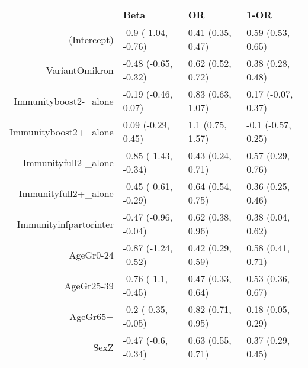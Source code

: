 \begin{table}[ht]
\centering
\begin{tabular}{rlll}
  \hline
 & Beta & OR & 1-OR \\ 
  \hline
(Intercept) & -0.9 (-1.04, -0.76) & 0.41 (0.35, 0.47) & 0.59 (0.53, 0.65) \\ 
  VariantOmikron & -0.48 (-0.65, -0.32) & 0.62 (0.52, 0.72) & 0.38 (0.28, 0.48) \\ 
  Immunityboost2-\_alone & -0.19 (-0.46, 0.07) & 0.83 (0.63, 1.07) & 0.17 (-0.07, 0.37) \\ 
  Immunityboost2+\_alone & 0.09 (-0.29, 0.45) & 1.1 (0.75, 1.57) & -0.1 (-0.57, 0.25) \\ 
  Immunityfull2-\_alone & -0.85 (-1.43, -0.34) & 0.43 (0.24, 0.71) & 0.57 (0.29, 0.76) \\ 
  Immunityfull2+\_alone & -0.45 (-0.61, -0.29) & 0.64 (0.54, 0.75) & 0.36 (0.25, 0.46) \\ 
  Immunityinfpartorinter & -0.47 (-0.96, -0.04) & 0.62 (0.38, 0.96) & 0.38 (0.04, 0.62) \\ 
  AgeGr0-24 & -0.87 (-1.24, -0.52) & 0.42 (0.29, 0.59) & 0.58 (0.41, 0.71) \\ 
  AgeGr25-39 & -0.76 (-1.1, -0.45) & 0.47 (0.33, 0.64) & 0.53 (0.36, 0.67) \\ 
  AgeGr65+ & -0.2 (-0.35, -0.05) & 0.82 (0.71, 0.95) & 0.18 (0.05, 0.29) \\ 
  SexZ & -0.47 (-0.6, -0.34) & 0.63 (0.55, 0.71) & 0.37 (0.29, 0.45) \\ 
   \hline
\end{tabular}
\end{table}
